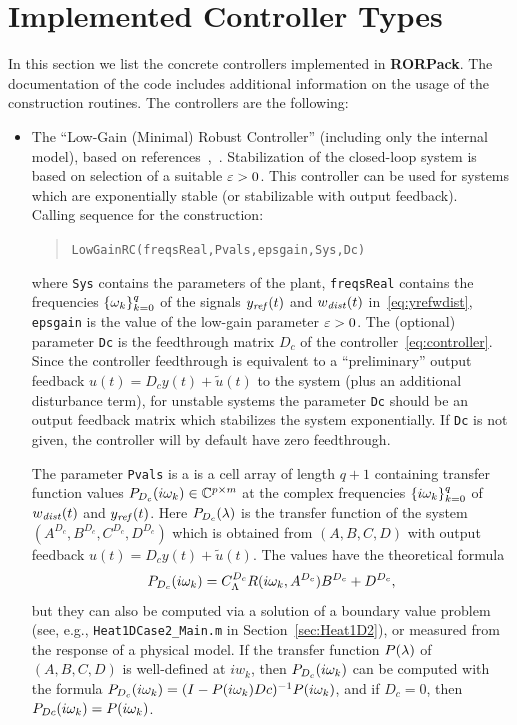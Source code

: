 \documentclass[11pt, a4paper]{amsart}
\newcommand{\CL}{C_\Lambda}
\theoremstyle{definition}
\numberwithin{equation}{section}
\newcommand{\yref}{y_{\mbox{\scriptsize\textit{ref}}}}
\newcommand{\wdist}{w_{\mbox{\scriptsize\textit{dist}}}}
\newcommand{\RORname}{\textbf{RORPack}}
\begin{document}
\section{Implemented Controller Types}
\label{sec:ControllerTypes}

In this section we list the concrete controllers implemented in \RORname.
The documentation of the code includes additional information on the usage of the construction routines.
The controllers are the following:
\begin{itemize}
  \item The ``Low-Gain (Minimal) Robust Controller'' (including only the internal model), based on references~\cite{HamPoh00,RebWei03},~. Stabilization of the closed-loop system is based on selection of a suitable  $\varepsilon>0$. This controller can be used for systems which are exponentially stable (or stabilizable with output feedback).\\[1ex]
      Calling sequence for the construction:\\[-1ex]
     \begin{quotation}
       \texttt{LowGainRC(freqsReal,Pvals,epsgain,Sys,Dc)}
     \end{quotation}
     \medskip
     where \texttt{Sys} contains the parameters of the plant, \texttt{freqsReal} contains the frequencies $\{\omega_k\}_{k=0}^q$ of the signals $\yref(t)$ and $\wdist(t)$ in~\eqref{eq:yrefwdist}, \texttt{epsgain} is the value of the low-gain parameter $\varepsilon>0$. 
The (optional) parameter \texttt{Dc} is the feedthrough matrix $D_c$ of the controller~\eqref{eq:controller}. Since the controller feedthrough 
 is equivalent to a ``preliminary'' output feedback  $u(t)=D_c y(t)+ \tilde{u}(t)$ to the system (plus an additional disturbance term), for unstable systems the parameter \texttt{Dc} should be an output feedback matrix which stabilizes the system exponentially. 
If \texttt{Dc} is not given, the controller will by default have zero feedthrough.

The parameter \texttt{Pvals} is a is a cell array of length $q+1$ containing transfer function values $P_{D_c}(i\omega_k)\in {\mathbb{C}}^{p\times m}$ at the complex frequencies $\{i\omega_k\}_{k=0}^q$ of $\wdist(t)$ and $\yref(t)$. Here $P_{D_c}(\lambda)$ is the transfer function of the system $(A^{D_c},B^{D_c},C^{D_c},D^{D_c})$ which is obtained from $(A,B,C,D)$ with output feedback $u(t)=D_c y(t)+ \tilde{u}(t)$.
The values have the theoretical formula
 $$P_{D_c}(i\gw_k)=\CL^{D_c} R(i\gw_k,A^{D_c})B^{D_c}+D^{D_c},$$
 but they can also be computed via a solution of a boundary value problem (see, e.g., \texttt{Heat1DCase2\_Main.m} in Section~\ref{sec:Heat1D2}), or measured from the response of a physical model. 
If the
transfer function $P(\lambda)$ of $(A,B,C,D)$ is well-defined at
$iw_k$, then $P_{D_c}(i\omega_k)$ can be computed with the formula 
$P_{D_c}(i\omega_k) = (I-P(i\omega_k)Dc)^{-1} P(i\omega_k)$, and if $D_c=0$, then 
$P_{Dc}(i\omega_k) = P(i\omega_k)$.



\end{itemize}
\end{document}
